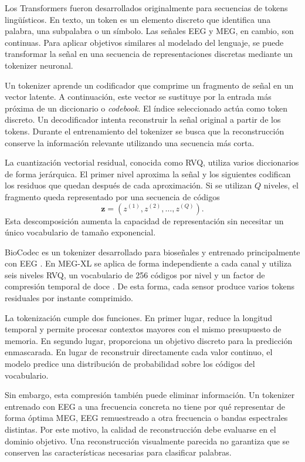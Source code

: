 Los Transformers fueron desarrollados originalmente para secuencias de tokens lingüísticos. En texto, un token es un elemento discreto que identifica una palabra, una subpalabra o un símbolo. Las señales EEG y MEG, en cambio, son continuas. Para aplicar objetivos similares al modelado del lenguaje, se puede transformar la señal en una secuencia de representaciones discretas mediante un tokenizer neuronal.

Un tokenizer aprende un codificador que comprime un fragmento de señal en un vector latente. A continuación, este vector se sustituye por la entrada más próxima de un diccionario o \textit{codebook}. El índice seleccionado actúa como token discreto. Un decodificador intenta reconstruir la señal original a partir de los tokens. Durante el entrenamiento del tokenizer se busca que la reconstrucción conserve la información relevante utilizando una secuencia más corta.

La cuantización vectorial residual, conocida como RVQ, utiliza varios diccionarios de forma jerárquica. El primer nivel aproxima la señal y los siguientes codifican los residuos que quedan después de cada aproximación. Si se utilizan \(Q\) niveles, el fragmento queda representado por una secuencia de códigos
\[
    \mathbf{z} =
    \left(z^{(1)},z^{(2)},\ldots,z^{(Q)}\right).
\]
Esta descomposición aumenta la capacidad de representación sin necesitar un único vocabulario de tamaño exponencial.

BioCodec es un tokenizer desarrollado para bioseñales y entrenado principalmente con EEG \cite{avramidis2025biocodec}. En MEG-XL se aplica de forma independiente a cada canal y utiliza seis niveles RVQ, un vocabulario de 256 códigos por nivel y un factor de compresión temporal de doce \cite{jayalath2026megxl}. De esta forma, cada sensor produce varios tokens residuales por instante comprimido.

La tokenización cumple dos funciones. En primer lugar, reduce la longitud temporal y permite procesar contextos mayores con el mismo presupuesto de memoria. En segundo lugar, proporciona un objetivo discreto para la predicción enmascarada. En lugar de reconstruir directamente cada valor continuo, el modelo predice una distribución de probabilidad sobre los códigos del vocabulario.

Sin embargo, esta compresión también puede eliminar información. Un tokenizer entrenado con EEG a una frecuencia concreta no tiene por qué representar de forma óptima MEG, EEG remuestreado a otra frecuencia o bandas espectrales distintas. Por este motivo, la calidad de reconstrucción debe evaluarse en el dominio objetivo. Una reconstrucción visualmente parecida no garantiza que se conserven las características necesarias para clasificar palabras.

